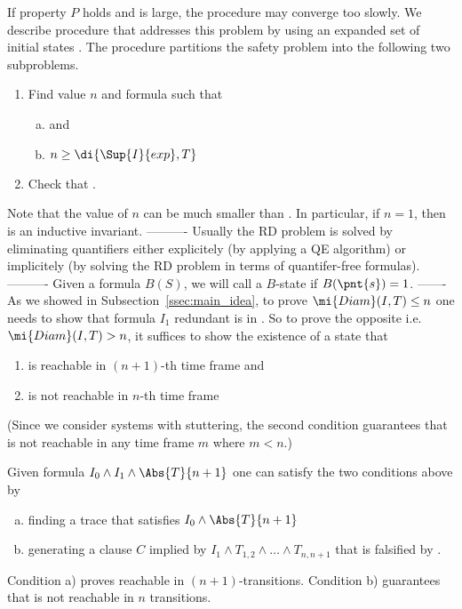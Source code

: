 If property $P$ holds and  is large, the \FB procedure may
converge too slowly.  We describe procedure \PP that addresses this
problem by using an expanded set of initial states . The
\PP procedure partitions the safety problem into the following two
subproblems.
\begin{enumerate}
\item Find value $n$ and formula  such that 
\begin{enumerate}[a)]
\item {} and 
\item  $n \geq \di{\Sup{I}{exp},T}$
\end{enumerate}
\item Check that .
\end{enumerate}
Note that the value of $n$ can be much smaller than . In
particular, if $n=1$, then  is an inductive invariant.
----------
Usually the RD problem is solved by
eliminating quantifiers either explicitely (by applying a QE
algorithm) or implicitely (by solving the RD problem in terms of
quantifer-free formulas). 
----------
 Given a formula $B(S)$, we will call  a $B$-state if
$B(\pnt{s})=1$.
-------
As we showed in Subsection~\ref{ssec:main_idea}, to prove
$\mi{Diam}(I,T) \leq n$ one needs to show that formula $I_1$ redundant
is in . So to
prove the opposite i.e.  $\mi{Diam}(I,T) > n$, it suffices to show the
existence of a state  that
\begin{enumerate}
\item is reachable in $(n+1)$-th time frame and 
\item is not reachable in $n$-th time frame
\end{enumerate}
(Since we consider systems with stuttering, the second condition
guarantees that  is not reachable in any time frame $m$ where
$m < n$.)

Given formula $I_0 \wedge I_1 \wedge \Abs{T}{n+1}$ one can satisfy
the two conditions above by 
\begin{enumerate}[a)]
\item finding a trace  that satisfies $I_0 \wedge
  \Abs{T}{n+1}$
\item generating a clause $C$ implied by $I_1 \wedge T_{1,2} \wedge
  \dots \wedge T_{n,n+1}$ that is falsified by .
\end{enumerate}
Condition a) proves  reachable in $(n+1)$-transitions.
Condition b) guarantees that  is not reachable in
$n$ transitions. 

